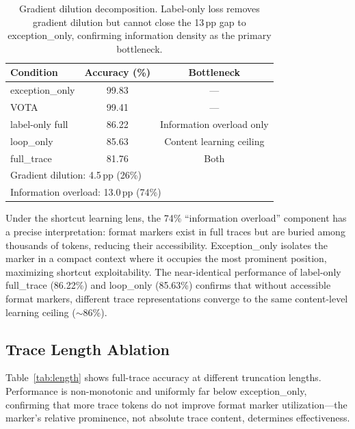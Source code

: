 \documentclass[11pt,a4paper]{article}
\newcommand{\pp}{\,\text{pp}}
\begin{document}
\begin{table}[t]
\centering
\small
\begin{tabular}{lcc}
\toprule
\textbf{Condition} & \textbf{Accuracy (\%)} & \textbf{Bottleneck} \\
\midrule
exception\_only & 99.83 & --- \\
VOTA & 99.41 & --- \\
label-only full & 86.22 & Information overload only \\
loop\_only & 85.63 & Content learning ceiling \\
full\_trace & 81.76 & Both \\
\midrule
\multicolumn{3}{l}{\small Gradient dilution: 4.5$\pp$ (26\%)} \\
\multicolumn{3}{l}{\small Information overload: 13.0$\pp$ (74\%)} \\
\bottomrule
\end{tabular}
\caption{Gradient dilution decomposition. Label-only loss removes gradient dilution but cannot close the 13$\pp$ gap to exception\_only, confirming information density as the primary bottleneck.}
\label{tab:density}
\end{table}

Under the shortcut learning lens, the 74\% ``information overload'' component has a precise interpretation: format markers exist in full traces but are buried among thousands of tokens, reducing their accessibility.
Exception\_only isolates the marker in a compact context where it occupies the most prominent position, maximizing shortcut exploitability.
The near-identical performance of label-only full\_trace (86.22\%) and loop\_only (85.63\%) confirms that without accessible format markers, different trace representations converge to the same content-level learning ceiling (${\sim}$86\%).

\subsection{Trace Length Ablation}
\label{sec:length}

Table~\ref{tab:length} shows full-trace accuracy at different truncation lengths.
Performance is non-monotonic and uniformly far below exception\_only, confirming that more trace tokens do not improve format marker utilization---the marker's relative prominence, not absolute trace content, determines effectiveness.
\end{document}
